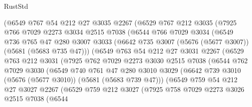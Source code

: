 \begin{lexlean}{RustStd}
\begin{coremodule}
            (@6549
              @767
              @54
              @212
              @27
              @3035
              @2267
              (@6529
                @767
                @212
                @3035
                (@7925
                  @766
                  @7029
                  @2273
                  @3034
                  @2515
                  @7038
                  (@6544
                    @766
                    @7029
                    @3034
                    (@6549
                      @736
                      @765
                      @47
                      @280
                      @3007
                      @3033
                      (@6642 @735 @3007 (@5676 (@5677 @3007)) (@5681 (@5683 @735 @47)))
                      (@6549
                        @763
                        @54
                        @212
                        @27
                        @3031
                        @2267
                        (@6529
                          @763
                          @212
                          @3031
                          (@7925
                            @762
                            @7029
                            @2273
                            @3030
                            @2515
                            @7038
                            (@6544
                              @762
                              @7029
                              @3030
                              (@6549
                                @740
                                @761
                                @47
                                @280
                                @3010
                                @3029
                                (@6642 @739 @3010 (@5676 (@5677 @3010)) (@5681 (@5683 @739 @47)))
                                (@6549
                                  @759
                                  @54
                                  @212
                                  @27
                                  @3027
                                  @2267
                                  (@6529
                                    @759
                                    @212
                                    @3027
                                    (@7925
                                      @758
                                      @7029
                                      @2273
                                      @3026
                                      @2515
                                      @7038
                                      (@6544

\end{coremodule}
\end{lexlean}
